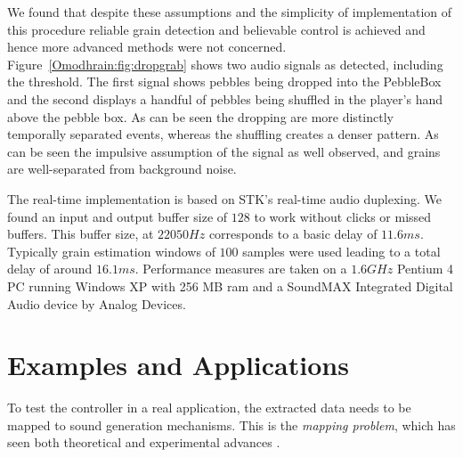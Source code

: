 We found that despite these assumptions and the simplicity of
implementation of this procedure reliable grain detection and
believable control is achieved and hence more advanced methods were
not concerned. Figure~\ref{Omodhrain:fig:dropgrab} shows two audio signals as
detected, including the threshold. The first signal shows pebbles
being dropped into the PebbleBox and the second displays a handful of
pebbles being shuffled in the player's hand above the pebble box. As
can be seen the dropping are more distinctly temporally separated
events, whereas the shuffling creates a denser pattern. As can be seen
the impulsive assumption of the signal as well observed, and grains
are well-separated from background noise.

The real-time implementation is based on STK's real-time audio
duplexing. We found an input and output buffer size of $128$ to work
without clicks or missed buffers. This buffer size, at $22050 Hz$ corresponds to a
basic delay of $11.6 ms$. Typically grain estimation windows of $100$
samples were used leading to a total delay of around $16.1
ms$. Performance measures are taken on a $1.6GHz$ Pentium 4 PC
 running Windows XP with 256 MB ram and a SoundMAX Integrated
Digital Audio device by Analog Devices.




\section{Examples and Applications}


To test the controller in a real application, the extracted data needs to be
mapped to sound generation mechanisms. This is the \textit{mapping
problem}, which has seen both theoretical and experimental advances
\cite[for example]{Hunt:2000b,Hunt:2002,Rovan:1997}.

